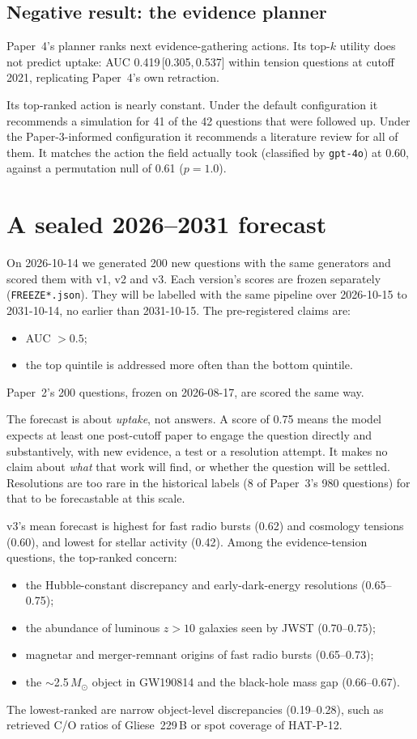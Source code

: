 \documentclass[11pt]{article}
\newcommand{\ci}[2]{\,[#1,\,#2]}
\begin{document}
\subsection{Negative result: the evidence planner}
Paper~4's planner ranks next evidence-gathering actions. Its top-$k$ utility
does not predict uptake: AUC 0.419\ci{0.305}{0.537} within tension questions
at cutoff 2021, replicating Paper~4's own retraction.

Its top-ranked action is nearly constant. Under the default configuration it
recommends a simulation for 41 of the 42 questions that were followed up.
Under the Paper-3-informed configuration it recommends a literature review for
all of them. It matches the action the field actually took (classified by
\texttt{gpt-4o}) at 0.60, against a permutation null of 0.61 ($p=1.0$).

\section{A sealed 2026--2031 forecast}\label{sec:prospective}

On 2026-10-14 we generated 200 new questions with the same generators and
scored them with v1, v2 and v3. Each version's scores are frozen separately
(\texttt{FREEZE*.json}). They will be labelled with the same pipeline over
2026-10-15 to 2031-10-14, no earlier than 2031-10-15. The pre-registered claims
are:
\begin{itemize}
\item AUC $>0.5$;
\item the top quintile is addressed more often than the bottom quintile.
\end{itemize}
Paper~2's 200 questions, frozen on 2026-08-17, are scored the same way.

The forecast is about \emph{uptake}, not answers. A score of 0.75 means the
model expects at least one post-cutoff paper to engage the question directly
and substantively, with new evidence, a test or a resolution attempt. It makes
no claim about \emph{what} that work will find, or whether the question will be
settled. Resolutions are too rare in the historical labels (8 of Paper~3's
980 questions) for that to be forecastable at this scale.

v3's mean forecast is highest for fast radio bursts (0.62) and cosmology
tensions (0.60), and lowest for stellar activity (0.42). Among the
evidence-tension questions, the top-ranked concern:
\begin{itemize}
\item the Hubble-constant discrepancy and early-dark-energy resolutions
  (0.65--0.75);
\item the abundance of luminous $z>10$ galaxies seen by JWST (0.70--0.75);
\item magnetar and merger-remnant origins of fast radio bursts (0.65--0.73);
\item the $\sim$2.5\,$M_\odot$ object in GW190814 and the black-hole mass gap
  (0.66--0.67).
\end{itemize}
The lowest-ranked are narrow object-level discrepancies (0.19--0.28), such as
retrieved C/O ratios of Gliese~229\,B or spot coverage of HAT-P-12.
\end{document}
